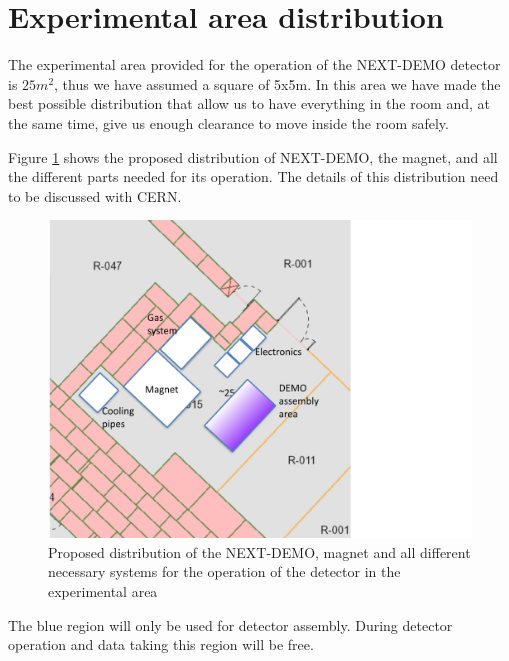 
\section{Experimental area distribution}

The experimental area provided for the operation of the NEXT-DEMO detector is $25m^2$, thus we have assumed a square of 5x5m. In this area we have made the best possible distribution that allow us to have everything in the room and, at the same time, give us enough clearance to move inside the room safely.

Figure \ref{fig:Distribution} shows the proposed distribution of NEXT-DEMO, the magnet, and all the different parts needed for its operation. The details of this distribution need to be discussed with CERN.

\begin{figure}
\centering
\includegraphics[angle=0,width=\textwidth]{img/distribution_examples.pdf}
\caption{Proposed distribution of the NEXT-DEMO, magnet and all different necessary systems for the operation of the detector in the experimental area} \label{fig:Distribution}
\end{figure}

The blue region will only be used for detector assembly. During detector operation and data taking this region will be free.